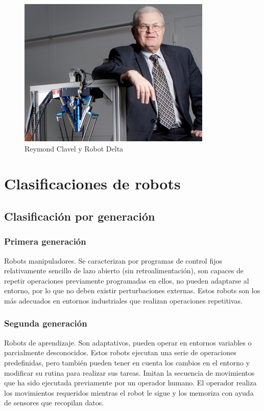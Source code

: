     \begin{figure}[htb]
        \centering
        \includegraphics[width=0.36\linewidth]{Main/Chapter2/Images2/Reymond-Clavel-Robot-Delta.png}
        \caption{Reymond Clavel y Robot Delta \cite{cap2_rey}}
        \label{f:Cap2_general_4}
    \end{figure}
    
    
\newpage    
    
\section{Clasificaciones de robots}
    
    \subsection{Clasificación por generación}
        \subsubsection{Primera generación}
            Robots manipuladores. Se caracterizan por programas de control fijos relativamente sencillo de lazo abierto (sin retroalimentación), son capaces de repetir operaciones previamente programadas en ellos, no pueden adaptarse al entorno, por lo que no deben existir perturbaciones externas. Estos robots son los más adecuados en entornos industriales que realizan operaciones repetitivas.
        
        \subsubsection{Segunda generación}
            Robots de aprendizaje. Son adaptativos, pueden operar en entornos variables o parcialmente desconocidos. Estos robots ejecutan una serie de operaciones predefinidas, pero también pueden tener en cuenta los cambios en el entorno y modificar su rutina para realizar sus tareas. Imitan la secuencia de movimientos que ha sido ejecutada previamente por un operador humano. El operador realiza los movimientos requeridos mientras el robot le sigue y los memoriza con ayuda de sensores que recopilan datos.
